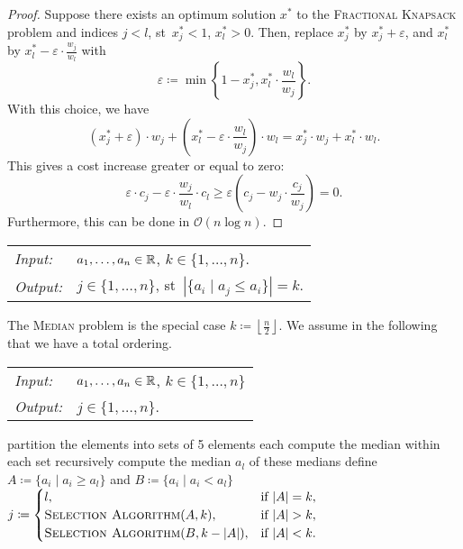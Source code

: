\documentclass[../skript.tex]{subfiles}
\begin{document}
\begin{proof}
Suppose there exists an optimum solution $x^*$ to the \textsc{Fractional Knapsack} problem and indices $j < l$, \ac{st}\ $x_j^* < 1$, $x_l^* > 0$.
Then, replace $x_j^*$ by $x_j^* + \varepsilon$, and $x_l^*$ by $x_l^* - \varepsilon \cdot \frac{w_j}{w_l}$ with
\[
	\varepsilon \coloneqq \min \left\{ 1-x_j^*, x_l^* \cdot \frac{w_l}{w_j} \right\}.
\]
With this choice, we have
\[
	(x_j^* + \varepsilon) \cdot w_j + \left(x_l^* - \varepsilon \cdot \frac{w_l}{w_j}\right) \cdot w_l = x_j^* \cdot w_j + x_l^* \cdot w_l.
\]
This gives a cost increase greater or equal to zero:
\[
	\varepsilon \cdot c_j - \varepsilon \cdot \frac{w_j}{w_l} \cdot c_l \geq \varepsilon \left( c_j - w_j \cdot \frac{c_j}{w_j} \right) = 0.
\]
Furthermore, this can be done in $\mathcal{O}(n \log n)$.
\end{proof}
\begin{problem}[Selection]
\begin{tabular}{@{}ll}
\textit{Input:} & $a_1, \ldots, a_n \in \mathbb{R}$, $k \in \{ 1, \ldots, n \}$. \\
\textit{Output:} & $j \in \{ 1, \ldots, n \}$, \ac{st}\ $|\{ a_i \mid a_j \leq a_i \}| = k$.
\end{tabular}
\end{problem}
The \textsc{Median} problem is the special case $k \coloneqq \left\lfloor \frac{n}{2} \right\rfloor$.
We assume in the following that we have a total ordering.
\pagebreak
\begin{algorithmbox}
\begin{tabular}{@{}ll}
\textit{Input:} & $a_1, \ldots, a_n \in \mathbb{R}$, $k \in \{ 1, \ldots, n \}$ \\
\textit{Output:} & $j \in \{ 1, \ldots, n \}$.
\end{tabular}
\end{algorithmbox}
\vspace{-7pt}
\begin{algorithm}[H]
partition the elements into sets of 5 elements each\;
compute the median within each set\;
recursively compute the median $a_l$ of these medians\;
define $A \coloneqq \{ a_i \mid a_i \geq a_l \}$ and $B \coloneqq \{ a_i \mid a_i < a_l \}$\;
$j \coloneqq \begin{cases}
l, & \text{if } |A| = k, \\
\textsc{Selection Algorithm}(A, k), & \text{if } |A| > k, \\
\textsc{Selection Algorithm}(B, k - |A|), & \text{if } |A| < k.
\end{cases}$\;
\end{algorithm}
\end{document}
